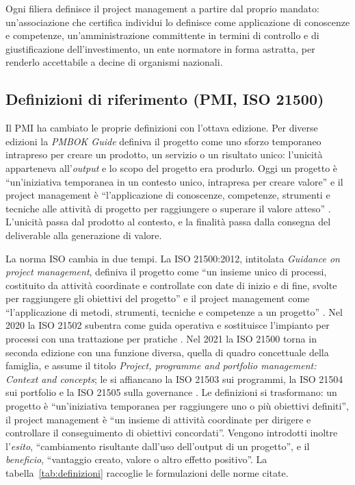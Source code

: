 Ogni filiera definisce il project management a partire dal proprio mandato:
un'associazione che certifica individui lo definisce come applicazione di
conoscenze e competenze, un'amministrazione committente in termini di controllo
e di giustificazione dell'investimento, un ente normatore in forma astratta, per
renderlo accettabile a decine di organismi nazionali.


\subsection{Definizioni di riferimento (PMI, ISO 21500)}
\label{sec:definizioni}

Il PMI ha cambiato le proprie definizioni con l'ottava edizione. Per diverse
edizioni la \emph{PMBOK Guide} definiva il progetto come uno sforzo temporaneo
intrapreso per creare un prodotto, un servizio o un risultato unico: l'unicit\`a
apparteneva all'\emph{output} e lo scopo del progetto era produrlo. Oggi un
progetto \`e ``un'iniziativa temporanea in un contesto unico, intrapresa per
creare valore'' e il project management \`e ``l'applicazione di conoscenze,
competenze, strumenti e tecniche alle attivit\`a di progetto per raggiungere o
superare il valore atteso'' \cite{pmbok8}. L'unicit\`a passa
dal prodotto al contesto, e la finalit\`a passa dalla consegna del deliverable
alla generazione di valore.

La norma ISO cambia in due tempi. La ISO 21500:2012, intitolata \emph{Guidance
on project management}, definiva il progetto come ``un insieme unico di
processi, costituito da attivit\`a coordinate e controllate con date di inizio e
di fine, svolte per raggiungere gli obiettivi del progetto'' e il project
management come ``l'applicazione di metodi, strumenti, tecniche e competenze a
un progetto'' \cite{iso21500-2012}. Nel 2020 la ISO 21502 subentra come guida
operativa e sostituisce l'impianto per processi con una trattazione per pratiche
\cite{iso21502}. Nel 2021 la ISO 21500 torna in seconda edizione con una
funzione diversa, quella di quadro concettuale della famiglia, e assume il
titolo \emph{Project, programme and portfolio management: Context and
concepts}; le si affiancano la ISO 21503 sui programmi, la ISO 21504 sui
portfolio e la ISO 21505 sulla governance \cite{iso21500-2021}. Le definizioni
si trasformano: un progetto \`e ``un'iniziativa temporanea per raggiungere uno o
pi\`u obiettivi definiti'', il project management \`e ``un insieme di attivit\`a
coordinate per dirigere e controllare il conseguimento di obiettivi
concordati''. Vengono introdotti inoltre l'\emph{esito}, ``cambiamento risultante
dall'uso dell'output di un progetto'', e il \emph{beneficio}, ``vantaggio
creato, valore o altro effetto positivo''. La tabella~\ref{tab:definizioni}
raccoglie le formulazioni delle norme citate. \newpage

